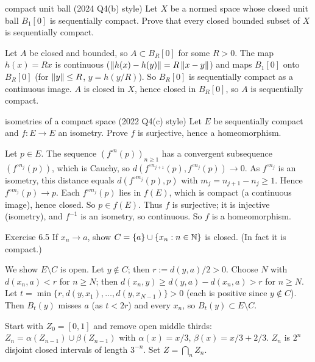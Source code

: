 \begin{exam}{compact unit ball (2024 Q4(b) style)}
Let $X$ be a normed space whose closed unit ball $B_1[0]$ is sequentially compact. Prove that
every closed bounded subset of $X$ is sequentially compact.
\end{exam}
\begin{answer}
Let $A$ be closed and bounded, so $A\subset B_R[0]$ for some $R>0$. The map $h(x)=Rx$ is
continuous ($\left\lVert h(x)-h(y)\right\rVert=R\left\lVert x-y\right\rVert$) and maps $B_1[0]$ onto $B_R[0]$ (for $\left\lVert y\right\rVert\le R$,
$y=h(y/R)$). So $B_R[0]$ is sequentially compact as a continuous image. $A$ is closed in $X$,
hence closed in $B_R[0]$, so $A$ is sequentially compact.
\end{answer}

\begin{exam}{isometries of a compact space (2022 Q4(c) style)}
Let $E$ be sequentially compact and $f:E\to E$ an isometry. Prove $f$ is surjective, hence a
homeomorphism.
\end{exam}
\begin{answer}
Let $p\in E$. The sequence $(f^{\circ n}(p))_{n\ge1}$ has a convergent subsequence
$(f^{\circ n_j}(p))$, which is Cauchy, so $d(f^{\circ n_{j+1}}(p),f^{\circ n_j}(p))\to0$. As
$f^{\circ n_j}$ is an isometry, this distance equals $d(f^{\circ m_j}(p),p)$ with
$m_j=n_{j+1}-n_j\ge1$. Hence $f^{\circ m_j}(p)\to p$. Each $f^{\circ m_j}(p)$ lies in $f(E)$,
which is compact (a continuous image), hence closed. So $p\in f(E)$. Thus $f$ is surjective; it
is injective (isometry), and $f^{-1}$ is an isometry, so continuous. So $f$ is a homeomorphism.
\end{answer}

\begin{exam}{Exercise 6.5}
If $x_n\to a$, show $C=\{a\}\cup\{x_n:n\in\mathbb N\}$ is closed. (In fact it is compact.)
\end{exam}
\begin{answer}
We show $E\setminus C$ is open. Let $y\notin C$; then $r:=d(y,a)/2>0$. Choose $N$ with
$d(x_n,a)<r$ for $n\ge N$; then $d(x_n,y)\ge d(y,a)-d(x_n,a)>r$ for $n\ge N$. Let
$t=\min\{r,d(y,x_1),\dots,d(y,x_{N-1})\}>0$ (each is positive since $y\notin C$). Then $B_t(y)$
misses $a$ (as $t<2r$) and every $x_n$, so $B_t(y)\subset E\setminus C$.
\end{answer}

Start with $Z_0=[0,1]$ and remove open middle thirds:
$Z_n=\alpha(Z_{n-1})\cup\beta(Z_{n-1})$ with $\alpha(x)=x/3$, $\beta(x)=x/3+2/3$.
$Z_n$ is $2^n$ disjoint closed intervals of length $3^{-n}$. Set $Z=\bigcap_nZ_n$.

